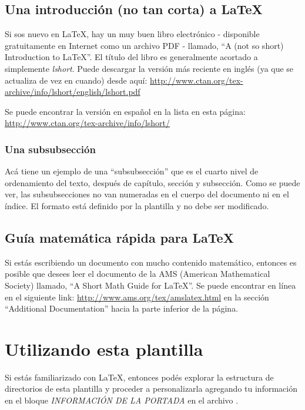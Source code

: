 \subsection{Una introducción (no tan corta) a \LaTeX{}}

Si sos nuevo en \LaTeX{}, hay un muy buen libro electrónico - disponible
gratuitamente en Internet como un archivo PDF - llamado, \enquote{A (not so
      short) Introduction to \LaTeX{}}. El título del libro es generalmente acortado
a simplemente \emph{lshort}. Puede descargar la versión más reciente en inglés
(ya que se actualiza de vez en cuando) desde aquí:
\url{http://www.ctan.org/tex-archive/info/lshort/english/lshort.pdf}

Se puede encontrar la versión en español en la lista en esta página:
\url{http://www.ctan.org/tex-archive/info/lshort/}

\subsubsection{Una subsubsección}

Acá tiene un ejemplo de una ``subsubsección'' que es el cuarto nivel de
ordenamiento del texto, después de capítulo, sección y subsección. Como se
puede ver, las subsubsecciones no van numeradas en el cuerpo del documento ni
en el índice. El formato está definido por la plantilla y no debe ser
modificado.

\subsection{Guía matemática rápida para \LaTeX{}}

Si estás escribiendo un documento con mucho contenido matemático, entonces es
posible que desees leer el documento de la AMS (American Mathematical Society)
llamado, \enquote{A Short Math Guide for \LaTeX{}}. Se puede encontrar en línea
en el siguiente link: \url{http://www.ams.org/tex/amslatex.html} en la sección
\enquote{Additional Documentation} hacia la parte inferior de la página.


\section{Utilizando esta plantilla}

Si estás familiarizado con \LaTeX{}, entonces podés explorar la estructura de
directorios de esta plantilla y proceder a personalizarla agregando tu
información en el bloque \emph{INFORMACIÓN DE LA PORTADA} en el archivo
.

